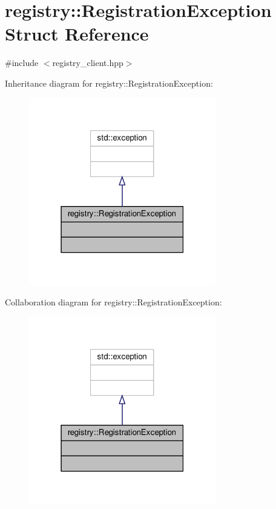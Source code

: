 \hypertarget{structregistry_1_1RegistrationException}{}\section{registry\+:\+:Registration\+Exception Struct Reference}
\label{structregistry_1_1RegistrationException}


{\ttfamily \#include $<$registry\+\_\+client.\+hpp$>$}



Inheritance diagram for registry\+:\+:Registration\+Exception\+:\nopagebreak
\begin{figure}[H]
\begin{center}
\leavevmode
\includegraphics[width=231pt]{structregistry_1_1RegistrationException__inherit__graph}
\end{center}
\end{figure}


Collaboration diagram for registry\+:\+:Registration\+Exception\+:\nopagebreak
\begin{figure}[H]
\begin{center}
\leavevmode
\includegraphics[width=231pt]{structregistry_1_1RegistrationException__coll__graph}
\end{center}
\end{figure}


